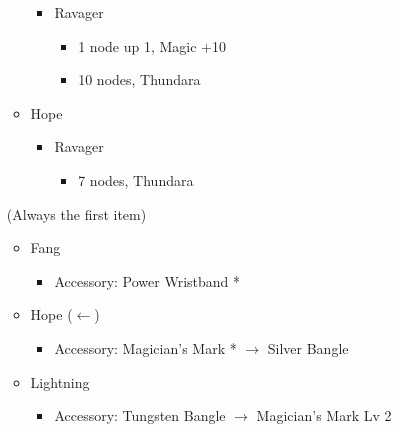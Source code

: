 \begin{multicols}{2}
\begin{menu}
\begin{itemize}
\begin{itemize}
\begin{itemize}
            \item Ravager
            \begin{itemize}
                \item 1 node up 1, Magic +10
                \item 10 nodes, Thundara
            \end{itemize}
        \end{itemize}
        \item Hope
        \begin{itemize}
            \item Ravager
            \begin{itemize}
                 \item 7 nodes, Thundara
            \end{itemize}
        \end{itemize}
    \end{itemize}
    \equip (Always the first item)
    \begin{itemize}
        \item Fang
        \begin{itemize}
                \item Accessory: Power Wristband *
        \end{itemize}
        \item Hope ($\leftarrow$)
        \begin{itemize}
                \item Accessory:  Magician's Mark * $\rightarrow$ Silver Bangle
        \end{itemize}
        \item Lightning
        \begin{itemize}
                \item Accessory: Tungsten Bangle $\rightarrow$ Magician's Mark Lv 2
        \end{itemize}
    \end{itemize}
\end{itemize}
\end{menu}

\renewcommand{\first}{[1] Aggression (\com/\com/\rav)}
\renewcommand{\second}{[2] Relentless Assault (\com/\rav/\rav)}
\renewcommand{\third}{[3] Smart Bomb (\sab/\rav/\rav)}
\renewcommand{\fourth}{[4] Mystic Tower (\sen/\rav/\rav)}
\renewcommand{\fifth}{[5] Guerilla (\sab/\rav/\syn)}
\renewcommand{\sixth}{[6] Relentless Assault (\com/\rav/\rav)}


\end{multicols}
